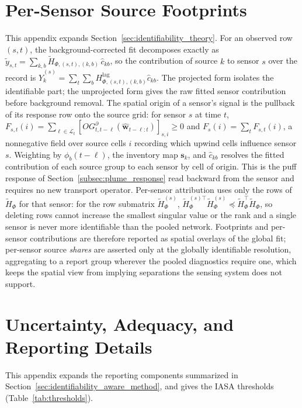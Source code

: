 \section{Per-Sensor Source Footprints}
\label{app:footprint_details}

This appendix expands Section~\ref{sec:identifiability_theory}.  For an
observed row \((s,t)\), the background-corrected fit decomposes exactly as
\(\widetilde y_{s,t}=\sum_{k,b}\widetilde H_{\Phi,(s,t),(k,b)}\,\widehat c_{kb}\),
so the contribution of source \(k\) to sensor \(s\) over the record is
\(\widehat Y^{(s)}_k=\sum_t\sum_b
H_{\Phi,(s,t),(k,b)}^{\mathrm{lag}}\widehat c_{kb}\).  The projected form isolates
the identifiable part; the unprojected form gives the raw fitted sensor
contribution before background removal.  The spatial origin of a sensor's signal
is the pullback of its response row onto the source grid: for sensor \(s\) at time
\(t\), \(F_{s,t}(i)=\sum_{\ell\in\mathcal L_t}
[O G_{t,t-\ell}^{\partial}(\widehat{\mathbf w}_{t-\ell:t})]_{s,i}\ge 0\) and
\(F_s(i)=\sum_t F_{s,t}(i)\), a nonnegative field over source cells \(i\)
recording which upwind cells influence sensor \(s\).  Weighting by
\(\phi_b(t-\ell)\), the inventory map \(\mathbf s_k\), and \(\widehat c_{kb}\)
resolves the fitted contribution of each source group to each sensor by cell of
origin.  This is the puff response of Section~\ref{subsec:plume_response} read
backward from the sensor and requires no new transport operator.  Per-sensor
attribution uses only the rows of \(\widetilde H_\Phi\) for that sensor: for the
row submatrix \(\widetilde H_\Phi^{(s)}\),
\(\widetilde H_\Phi^{(s)\top}\widetilde H_\Phi^{(s)}\preceq
\widetilde H_\Phi^\top\widetilde H_\Phi\), so deleting rows cannot increase the
smallest singular value or the rank and a single sensor is never more
identifiable than the pooled network.  Footprints and per-sensor contributions
are therefore reported as spatial overlays of the global fit; per-sensor source
\emph{shares} are asserted only at the globally identifiable resolution,
aggregating to a report group wherever the pooled diagnostics require one, which
keeps the spatial view from implying separations the sensing system does not
support.

\section{Uncertainty, Adequacy, and Reporting Details}
\label{app:reporting_details}

This appendix expands the reporting components summarized in
Section~\ref{sec:identifiability_aware_method}, and gives the IASA thresholds
(Table~\ref{tab:thresholds}).


